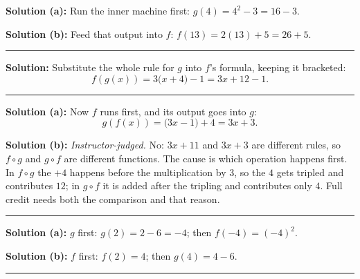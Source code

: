 \documentclass[12pt]{article}
\begin{document}



\textbf{Solution (a):} Run the inner machine first: $g(4) = 4^2 - 3 = 16 - 3$.

\textbf{Solution (b):} Feed that output into $f$: $f(13) = 2(13) + 5 = 26 + 5$.

\vspace{0.2cm}\noindent\rule{\linewidth}{0.2pt}\vspace{0.2cm}


\textbf{Solution:} Substitute the whole rule for $g$ into $f$'s formula, keeping
it bracketed:
\[ f(g(x)) = 3\bigl(x+4\bigr) - 1 = 3x + 12 - 1 . \]

\vspace{0.2cm}\noindent\rule{\linewidth}{0.2pt}\vspace{0.2cm}


\textbf{Solution (a):} Now $f$ runs first, and its output goes into $g$:
\[ g(f(x)) = \bigl(3x-1\bigr) + 4 = 3x + 3 . \]

\textbf{Solution (b):} \emph{Instructor-judged.} No: $3x+11$ and $3x+3$ are
different rules, so $f \circ g$ and $g \circ f$ are different functions. The
cause is which operation happens first. In $f \circ g$ the $+4$ happens before
the multiplication by $3$, so the $4$ gets tripled and contributes $12$; in
$g \circ f$ it is added after the tripling and contributes only $4$. Full credit
needs both the comparison and that reason.

\vspace{0.2cm}\noindent\rule{\linewidth}{0.2pt}\vspace{0.2cm}


\textbf{Solution (a):} $g$ first: $g(2) = 2 - 6 = -4$; then $f(-4) = (-4)^2$.

\textbf{Solution (b):} $f$ first: $f(2) = 4$; then $g(4) = 4 - 6$. 

\vspace{0.2cm}\noindent\rule{\linewidth}{0.2pt}\vspace{0.2cm}
\end{document}
